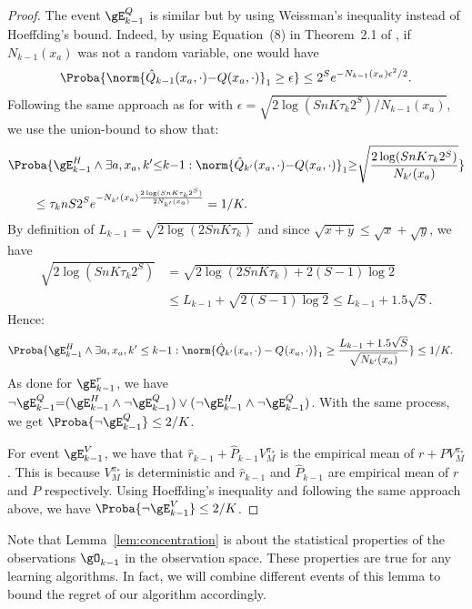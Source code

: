 \begin{proof}
    The event $\gE_{k-1}^Q$ is similar but by using Weissman's inequality \cite{weissman2003inequalities} instead of Hoeffding's bound. Indeed, by using Equation~(8) in Theorem~2.1 of \cite{weissman2003inequalities}, if $N_{k-1}(x_a)$ was not a random variable, one would have 
    \begin{align*}
        \Proba{\norm{\hat{Q}_{k-1}(x_a,\cdot){-}Q(x_a,\cdot)}_1\ge \epsilon} \le 2^S e^{- N_{k-1}(x_a) \epsilon^2/2}.
    \end{align*}
    Following the same approach as for  with $\epsilon=\sqrt{2\log(SnK\tau_k2^S)/N_{k-1}(x_a)}$, we use the union-bound to show that:
    \begin{align*}
        &\Proba{\gE_{k-1}^H\land\exists a, x_a, k'{\le}k{-}1: \norm{\hat{Q}_{k'}(x_a,\cdot){-}Q(x_a,\cdot)}_1 {\ge} \sqrt{\frac{2\log(SnK\tau_k 2^S)}{N_{k'}(x_a)}}} \\
        &\qquad \le \tau_k n S 2^Se^{ -N_{k'}(x_a)\frac{2\log(SnK\tau_k2^S)}{2N_{k'}(x_a)}} = 1/K.
    \end{align*}
    By definition of $L_{k-1}=\sqrt{2\log(2SnK\tau_k)}$ and since $\sqrt{x+y}\le\sqrt{x}+\sqrt{y}$, we have
    \begin{align*}
      \sqrt{2\log(SnK\tau_k2^S)}
      &=\sqrt{2\log(2SnK\tau_k) {+} 2(S-1)\log 2}\\
      & \le L_{k-1} +\sqrt{2(S-1)\log2} \le L_{k-1} + 1.5\sqrt{S}.
    \end{align*}
    Hence: 
    \begin{align*}
        &\Proba{\gE_{k-1}^H\land\exists a, x_a, k'\le k{-}1: \norm{\hat{Q}_{k'}(x_a,\cdot)-Q_{}(x_a,\cdot)}_1 \ge \frac{L_{k-1}+1.5\sqrt{S}}{\sqrt{N_{k'}(x_a)}}} \le 1/K.
    \end{align*}
    As done for $\gE^r_{k-1}$, we have $\lnot \gE_{k-1}^Q {=}(\gE_{k-1}^H \land \lnot \gE_{k-1}^Q) \lor (\lnot \gE_{k-1}^H \land \lnot \gE_{k-1}^Q)$. With the same process, we get $\Proba{\lnot \gE_{k-1}^Q}\le 2/K$.
        
    For event $\gE_{k-1}^V$, we have that $\hat{r}_{k-1}+\hat{P}_{k-1}V_M^{\pi_*}$ is the empirical mean of $r+PV_M^{\pi_*}$.
    This is because $V_M^{\pi_*}$ is deterministic and $\hat{r}_{k-1}$ and $\hat{P}_{k-1}$ are empirical mean of $r$ and $P$ respectively.
    Using Hoeffding's inequality and following the same approach above, we have $\Proba{\neg \gE_{k-1}^V}\le 2/K$.
\end{proof}
Note that Lemma~\ref{lem:concentration} is about the statistical properties of the observations $\gO_{k-1}$ in the observation space.
These properties are true for any learning algorithms.
In fact, we will combine different events of this lemma to bound the regret of our algorithm accordingly.

